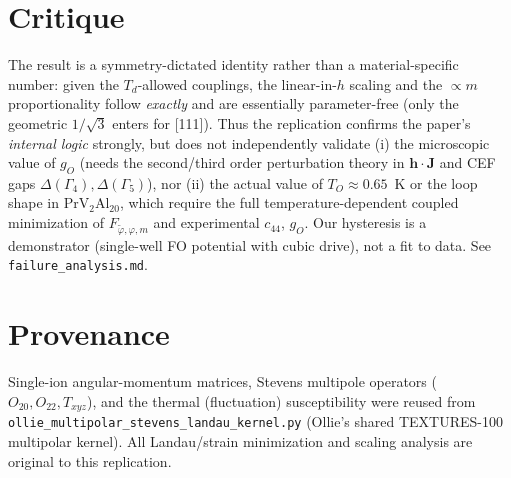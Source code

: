 \documentclass[11pt]{article}
\begin{document}
\section{Critique}
The result is a symmetry-dictated identity rather than a material-specific
number: given the $T_d$-allowed couplings, the linear-in-$h$ scaling and the
$\propto m$ proportionality follow \emph{exactly} and are essentially
parameter-free (only the geometric $1/\sqrt3$ enters for [111]). Thus the
replication confirms the paper's \emph{internal logic} strongly, but does not
independently validate (i) the microscopic value of $g_O$ (needs the second/third
order perturbation theory in $\mathbf{h}\!\cdot\!\mathbf{J}$ and CEF gaps
$\Delta(\Gamma_4),\Delta(\Gamma_5)$), nor (ii) the actual value of $T_O\approx
0.65$~K or the loop shape in PrV$_2$Al$_{20}$, which require the full
temperature-dependent coupled minimization of $F_{\tilde\varphi,\varphi,m}$ and
experimental $c_{44}$, $g_O$. Our hysteresis is a demonstrator (single-well FO
potential with cubic drive), not a fit to data. See
\texttt{failure\_analysis.md}.

\section{Provenance}
Single-ion angular-momentum matrices, Stevens multipole operators
($O_{20},O_{22},T_{xyz}$), and the thermal (fluctuation) susceptibility were
reused from \texttt{ollie\_multipolar\_stevens\_landau\_kernel.py} (Ollie's shared
TEXTURES-100 multipolar kernel). All Landau/strain minimization and scaling
analysis are original to this replication.
\end{document}
